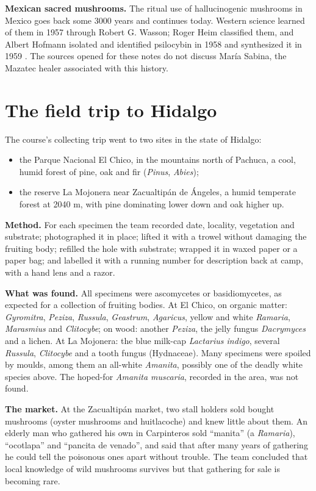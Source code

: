 \textbf{Mexican sacred mushrooms.}
The ritual use of hallucinogenic mushrooms
in Mexico goes back some 3000 years and
continues today. Western science learned of
them in 1957 through Robert G. Wasson; Roger
Heim classified them, and Albert Hofmann
isolated and identified psilocybin in 1958
and synthesized it in 1959
\cite{tyls2014psilocybin}. The sources
opened for these notes do not discuss
Mar\'ia Sabina, the Mazatec healer
associated with this history.

\section{The field trip to Hidalgo}
\label{section-field-trip}

The course's collecting trip went to two
sites in the state of Hidalgo:
\begin{itemize}
\item the Parque Nacional El Chico, in the
mountains north of Pachuca, a cool, humid
forest of pine, oak and fir (\emph{Pinus},
\emph{Abies});
\item the reserve La Mojonera near
Zacualtip\'an de \'Angeles, a humid temperate
forest at 2040 m, with pine dominating lower
down and oak higher up.
\end{itemize}

\textbf{Method.}
For each specimen the team recorded date,
locality, vegetation and substrate;
photographed it in place; lifted it with a
trowel without damaging the fruiting body;
refilled the hole with substrate; wrapped it
in waxed paper or a paper bag; and labelled
it with a running number for description
back at camp, with a hand lens and a razor.

\textbf{What was found.}
All specimens were ascomycetes or
basidiomycetes, as expected for a collection
of fruiting bodies. At El Chico, on organic
matter: \emph{Gyromitra}, \emph{Peziza},
\emph{Russula}, \emph{Geastrum},
\emph{Agaricus}, yellow and white
\emph{Ramaria}, \emph{Marasmius} and
\emph{Clitocybe}; on wood: another
\emph{Peziza}, the jelly fungus
\emph{Dacrymyces} and a lichen. At La
Mojonera: the blue milk-cap \emph{Lactarius
indigo}, several \emph{Russula},
\emph{Clitocybe} and a tooth fungus
(Hydnaceae). Many specimens were spoiled by
moulds, among them an all-white
\emph{Amanita}, possibly one of the deadly
white species above. The hoped-for
\emph{Amanita muscaria}, recorded in the
area, was not found.

\textbf{The market.}
At the Zacualtip\'an market, two stall
holders sold bought mushrooms (oyster
mushrooms and huitlacoche) and knew little
about them. An elderly man who gathered his
own in Carpinteros sold ``manita'' (a
\emph{Ramaria}), ``ocotlapa'' and ``pancita
de venado'', and said that after many years
of gathering he could tell the poisonous
ones apart without trouble. The team
concluded that local knowledge of wild
mushrooms survives but that gathering for
sale is becoming rare.





